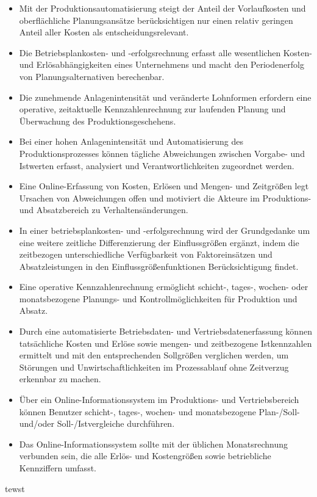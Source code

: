 \begin{itemize}
    \item Mit der Produktionsautomatisierung steigt der Anteil der Vorlaufkosten und oberflächliche Planungsansätze berücksichtigen nur einen relativ geringen Anteil aller Kosten als entscheidungsrelevant.
    \item Die Betriebsplankosten- und -erfolgsrechnung erfasst alle wesentlichen Kosten- und Erlösabhängigkeiten eines Unternehmens und macht den Periodenerfolg von Planungsalternativen berechenbar.
    \item Die zunehmende Anlagenintensität und veränderte Lohnformen erfordern eine operative, zeitaktuelle Kennzahlenrechnung zur laufenden Planung und Überwachung des Produktionsgeschehens.
    \item Bei einer hohen Anlagenintensität und Automatisierung des Produktionsprozesses können tägliche Abweichungen zwischen Vorgabe- und Istwerten erfasst, analysiert und Verantwortlichkeiten zugeordnet werden.
    \item Eine Online-Erfassung von Kosten, Erlösen und Mengen- und Zeitgrö{\ss}en legt Ursachen von Abweichungen offen und motiviert die Akteure im Produktions- und Absatzbereich zu Verhaltensänderungen.
    \item In einer betriebsplankosten- und -erfolgsrechnung wird der Grundgedanke um eine weitere zeitliche Differenzierung der Einflussgrö{\ss}en ergänzt, indem die zeitbezogen unterschiedliche Verfügbarkeit von Faktoreinsätzen und Absatzleistungen in den Einflussgrö{\ss}enfunktionen Berücksichtigung findet.
    \item Eine operative Kennzahlenrechnung ermöglicht schicht-, tages-, wochen- oder monatsbezogene Planungs- und Kontrollmöglichkeiten für Produktion und Absatz.
    \item Durch eine automatisierte Betriebsdaten- und Vertriebsdatenerfassung können tatsächliche Kosten und Erlöse sowie mengen- und zeitbezogene Istkennzahlen ermittelt und mit den entsprechenden Sollgrö{\ss}en verglichen werden, um Störungen und Unwirtschaftlichkeiten im Prozessablauf ohne Zeitverzug erkennbar zu machen.
    \item Über ein Online-Informationssystem im Produktions- und Vertriebsbereich können  Benutzer schicht-, tages-, wochen- und monatsbezogene Plan-/Soll- und/oder Soll-/Istvergleiche durchführen.
    \item Das Online-Informationssystem sollte mit der üblichen Monatsrechnung verbunden sein, die alle Erlös- und Kostengrö{\ss}en sowie betriebliche Kennziffern umfasst.
\end{itemize}

tewst

